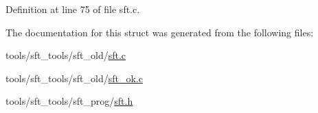 Definition at line 75 of file sft.c.



The documentation for this struct was generated from the following files:\begin{DoxyCompactItemize}
\item 
tools/sft\_\-tools/sft\_\-old/\hyperlink{sft_8c}{sft.c}\item 
tools/sft\_\-tools/sft\_\-old/\hyperlink{sft__ok_8c}{sft\_\-ok.c}\item 
tools/sft\_\-tools/sft\_\-prog/\hyperlink{sft_8h}{sft.h}\end{DoxyCompactItemize}
